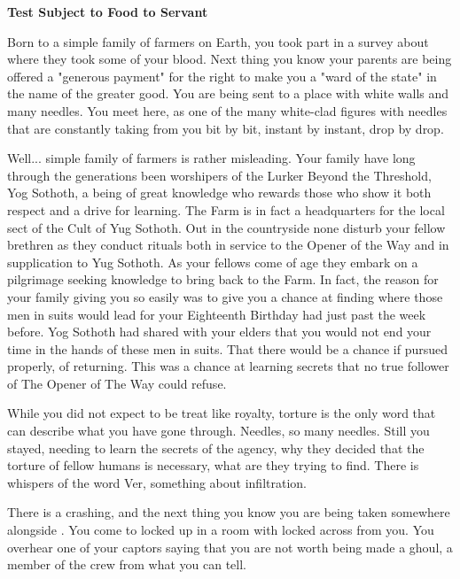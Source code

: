 \documentclass[char]{guildcamp4}
\begin{document}
\name{\cPlead{}}

\begin{center}{\bf Test Subject to Food to Servant}\end{center}

Born to a simple family of farmers on Earth, you took part in a survey about where they took some of your blood. Next thing you know your parents are being offered a "generous payment" for the right to make you a "ward of the state" in the name of the greater good. You are being sent to a place with white walls and many needles. You meet \cSpite{}  here, as one of the many white-clad figures with needles that are constantly taking from you bit by bit, instant by instant, drop by drop. 

Well... simple family of farmers is rather misleading. Your family have long through the generations been worshipers of the Lurker Beyond the Threshold, Yog Sothoth, a being of great knowledge who rewards those who show it both respect and a drive for learning. The Farm is in fact a headquarters for the local sect of the Cult of Yug Sothoth. Out in the countryside none disturb your fellow brethren as they conduct rituals both in service to the Opener of the Way and in supplication to Yug Sothoth. As your fellows come of age they embark on a pilgrimage seeking knowledge to bring back to the Farm. In fact, the reason for your family giving you so easily was to give you a chance at finding where those men in suits would lead for your Eighteenth Birthday had just past the week before. Yog Sothoth had shared with your elders that you would not end your time in the hands of these men in suits. That there would be a chance if pursued properly, of returning. This was a chance at learning secrets that no true follower of The Opener of The Way could refuse. 

While you did not expect to be treat like royalty, torture is the only word that can describe what you have gone through. Needles, so many needles. Still you stayed, needing to learn the secrets of the agency, why they decided that the torture of fellow humans is necessary, what are they trying to find. There is whispers of the word Ver, something about infiltration.

There is a crashing, and the next thing you know you are being taken somewhere alongside \cSpite{}. You come to locked up in a room with \cSpite{} locked across from you. You overhear one of your captors saying that you are not worth being made a ghoul, a member of the crew from what you can tell.
\end{document}

